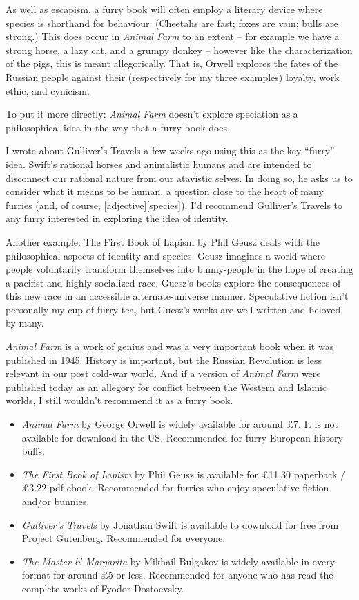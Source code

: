 As well as escapism, a furry book will often employ a literary device where species is shorthand for behaviour. (Cheetahs are fast; foxes are vain; bulls are strong.) This does occur in \textit{Animal Farm} to an extent -- for example we have a strong horse, a lazy cat, and a grumpy donkey -- however like the characterization of the pigs, this is meant allegorically. That is, Orwell explores the fates of the Russian people against their (respectively for my three examples) loyalty, work ethic, and cynicism.

To put it more directly: \textit{Animal Farm} doesn't explore speciation as a philosophical idea in the way that a furry book does.

I wrote about Gulliver's Travels a few weeks ago using this as the key ``furry'' idea. Swift's rational horses and animalistic humans and are intended to disconnect our rational nature from our atavistic selves. In doing so, he asks us to consider what it means to be human, a question close to the heart of many furries (and, of course, [adjective][species]). I'd recommend Gulliver's Travels to any furry interested in exploring the idea of identity.

Another example: The First Book of Lapism by Phil Geusz deals with the philosophical aspects of identity and species. Geusz imagines a world where people voluntarily transform themselves into bunny-people in the hope of creating a pacifist and highly-socialized race. Guesz's books explore the consequences of this new race in an accessible alternate-universe manner. Speculative fiction isn't personally my cup of furry tea, but Guesz's works are well written and beloved by many.

\textit{Animal Farm} is a work of genius and was a very important book when it was published in 1945. History is important, but the Russian Revolution is less relevant in our post cold-war world. And if a version of \textit{Animal Farm} were published today as an allegory for conflict between the Western and Islamic worlds, I still wouldn't recommend it as a furry book.

\begin{itemize}
  \item \textit{Animal Farm} by George Orwell is widely available for around £7. It is not available for download in the US. Recommended for furry European history buffs.
  \item \textit{The First Book of Lapism} by Phil Geusz is available for £11.30 paperback / £3.22 pdf ebook. Recommended for furries who enjoy speculative fiction and/or bunnies.
  \item \textit{Gulliver's Travels} by Jonathan Swift is available to download for free from Project Gutenberg. Recommended for everyone.
  \item \textit{The Master \& Margarita} by Mikhail Bulgakov is widely available in every format for around £5 or less. Recommended for anyone who has read the complete works of Fyodor Dostoevsky.
\end{itemize}
